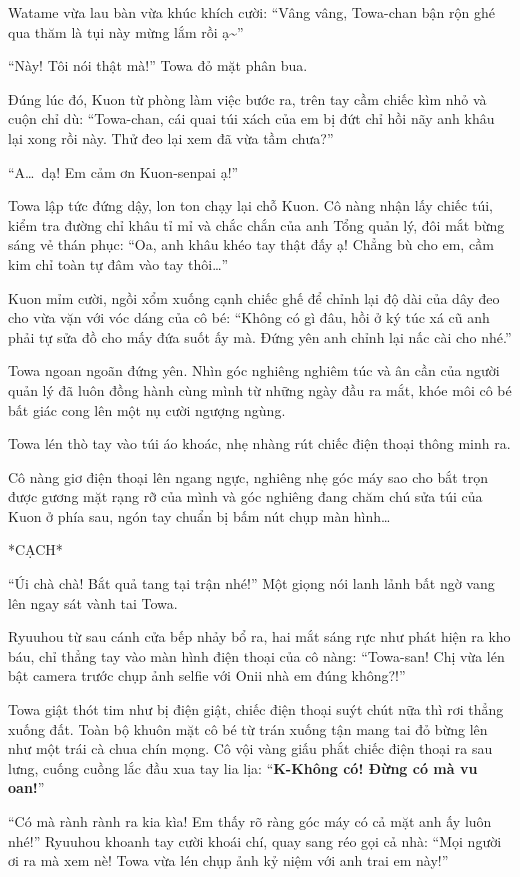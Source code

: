 \documentclass[../main.tex]{subfiles}
\begin{document}
Watame vừa lau bàn vừa khúc khích cười: ``Vâng vâng, Towa-chan bận rộn ghé qua thăm là tụi này mừng lắm rồi ạ\~{}''

``Này! Tôi nói thật mà!'' Towa đỏ mặt phân bua.

Đúng lúc đó, Kuon từ phòng làm việc bước ra, trên tay cầm chiếc kìm nhỏ và cuộn chỉ dù: ``Towa-chan, cái quai túi xách của em bị đứt chỉ hồi nãy anh khâu lại xong rồi này. Thử đeo lại xem đã vừa tầm chưa?''

``A\dots\ dạ! Em cảm ơn Kuon-senpai ạ!''

Towa lập tức đứng dậy, lon ton chạy lại chỗ Kuon. Cô nàng nhận lấy chiếc túi, kiểm tra đường chỉ khâu tỉ mỉ và chắc chắn của anh Tổng quản lý, đôi mắt bừng sáng vẻ thán phục: ``Oa, anh khâu khéo tay thật đấy ạ! Chẳng bù cho em, cầm kim chỉ toàn tự đâm vào tay thôi\dots''

Kuon mỉm cười, ngồi xổm xuống cạnh chiếc ghế để chỉnh lại độ dài của dây đeo cho vừa vặn với vóc dáng của cô bé: ``Không có gì đâu, hồi ở ký túc xá cũ anh phải tự sửa đồ cho mấy đứa suốt ấy mà. Đứng yên anh chỉnh lại nấc cài cho nhé.''

Towa ngoan ngoãn đứng yên. Nhìn góc nghiêng nghiêm túc và ân cần của người quản lý đã luôn đồng hành cùng mình từ những ngày đầu ra mắt, khóe môi cô bé bất giác cong lên một nụ cười ngượng ngùng.

Towa lén thò tay vào túi áo khoác, nhẹ nhàng rút chiếc điện thoại thông minh ra.

Cô nàng giơ điện thoại lên ngang ngực, nghiêng nhẹ góc máy sao cho bắt trọn được gương mặt rạng rỡ của mình và góc nghiêng đang chăm chú sửa túi của Kuon ở phía sau, ngón tay chuẩn bị bấm nút chụp màn hình\dots

*CẠCH*

``Úi chà chà! Bắt quả tang tại trận nhé!'' Một giọng nói lanh lảnh bất ngờ vang lên ngay sát vành tai Towa.

Ryuuhou từ sau cánh cửa bếp nhảy bổ ra, hai mắt sáng rực như phát hiện ra kho báu, chỉ thẳng tay vào màn hình điện thoại của cô nàng: ``Towa-san! Chị vừa lén bật camera trước chụp ảnh selfie với Onii nhà em đúng không?!''

Towa giật thót tim như bị điện giật, chiếc điện thoại suýt chút nữa thì rơi thẳng xuống đất. Toàn bộ khuôn mặt cô bé từ trán xuống tận mang tai đỏ bừng lên như một trái cà chua chín mọng. Cô vội vàng giấu phắt chiếc điện thoại ra sau lưng, cuống cuồng lắc đầu xua tay lia lịa: ``\textbf{K-Không có! Đừng có mà vu oan!}''

``Có mà rành rành ra kia kìa! Em thấy rõ ràng góc máy có cả mặt anh ấy luôn nhé!'' Ryuuhou khoanh tay cười khoái chí, quay sang réo gọi cả nhà: ``Mọi người ơi ra mà xem nè! Towa vừa lén chụp ảnh kỷ niệm với anh trai em này!''
\end{document}
